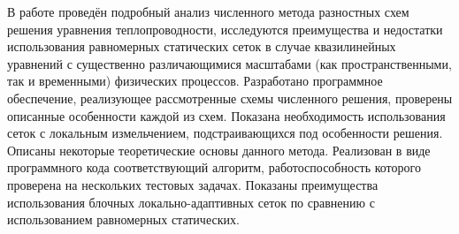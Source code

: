 В работе проведён подробный анализ численного метода разностных схем решения уравнения теплопроводности, исследуются преимущества и недостатки использования равномерных статических сеток в случае квазилинейных уравнений с существенно различающимися масштабами (как пространственными, так и временными) физических процессов.
Разработано программное обеспечение, реализующее рассмотренные схемы численного решения, проверены описанные особенности каждой из схем.
Показана необходимость использования сеток с локальным измельчением, подстраивающихся под особенности решения.
Описаны некоторые теоретические основы данного метода.
Реализован в виде программного кода соответствующий алгоритм, работоспособность которого проверена на нескольких тестовых задачах.
Показаны преимущества использования блочных локально-адаптивных сеток по сравнению с использованием равномерных статических.